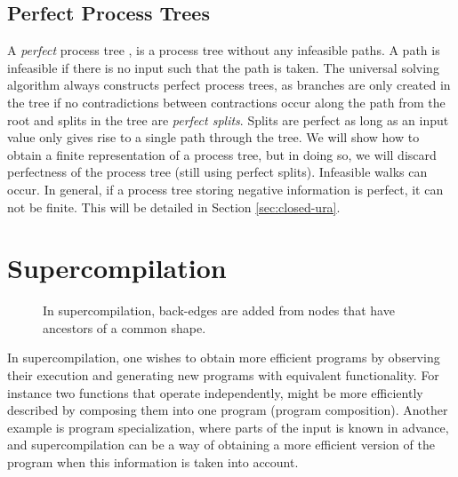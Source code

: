 \documentclass[10pt]{../sigplanconf}
\begin{document}
\subsection{Perfect Process Trees}
A \textit{perfect} process tree \cite{gluck1993occam}, is a process
tree without any infeasible paths. A path is infeasible if there is no
input such that the path is taken. The universal solving algorithm
always constructs perfect process trees, as branches are only created
in the tree if no contradictions between contractions occur along the
path from the root and splits in the tree are \textit{perfect
  splits}. Splits are perfect as long as an input value only gives
rise to a single path through the tree. We will show how to obtain a
finite representation of a process tree, but in doing so, we will
discard perfectness of the process tree (still using perfect
splits). Infeasible walks can occur. In general, if a process tree
storing negative information is perfect, it can not be finite. This
will be detailed in Section \ref{sec:closed-ura}.

\section{Supercompilation}
\label{sec:supercompilation}
\begin{figure}
  \centering
\caption{In supercompilation, back-edges are added from nodes that
  have ancestors of a common shape.}
  \label{fig:backedge}
\end{figure}

In supercompilation, one wishes to obtain more efficient programs by
observing their execution and generating new programs with equivalent
functionality. For instance two functions that operate independently,
might be more efficiently described by composing them into one program
(program composition). Another example is program specialization,
where parts of the input is known in advance, and supercompilation can
be a way of obtaining a more efficient version of the program when
this information is taken into account.
\end{document}
